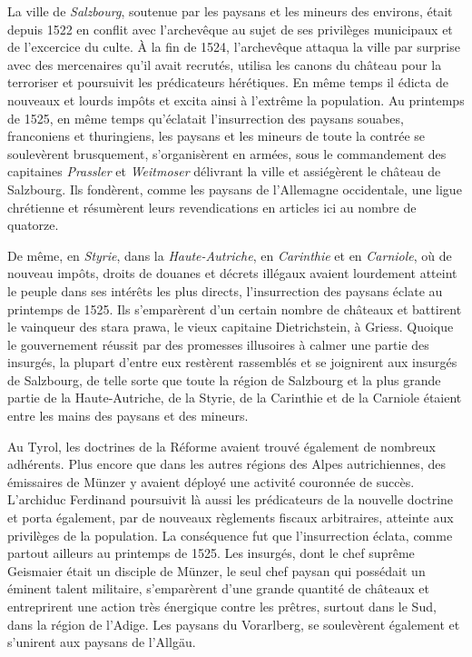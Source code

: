 \documentclass[french,twoside]{book} %
\begin{document}
La ville de \emph{Salzbourg}, soutenue par les paysans et les mineurs des environs, était depuis 1522 en conflit avec l’archevêque au sujet de ses privilèges municipaux et de l’excercice du culte. À la fin de 1524, l’archevêque attaqua la ville par surprise avec des mercenaires qu’il avait recrutés, utilisa les canons du château pour la terroriser et poursuivit les prédicateurs hérétiques. En même temps il édicta de nouveaux et lourds impôts et excita ainsi à l’extrême la population. Au printemps de 1525, en même temps qu’éclatait l’insurrection des paysans souabes, franconiens et thuringiens, les paysans et les mineurs de toute la contrée se soulevèrent brusquement, s’organisèrent en armées, sous le commandement des capitaines \emph{Prassler} et \emph{Weitmoser} délivrant la ville et assiégèrent le château de Salzbourg. Ils fondèrent, comme les paysans de l’Allemagne occidentale, une ligue chrétienne et résumèrent leurs revendications en articles ici au nombre de quatorze.\par
De même, en \emph{Styrie}, dans la \emph{Haute-Autriche}, en \emph{Carinthie} et en \emph{Carniole}, où de nouveau impôts, droits de douanes et décrets illégaux avaient lourdement atteint le peuple dans ses intérêts les plus directs, l’insurrection des paysans éclate au printemps de 1525. Ils s’emparèrent d’un certain nombre de châteaux et battirent le vainqueur des stara prawa, le vieux capitaine Dietrichstein, à Griess. Quoique le gouvernement réussit par des promesses illusoires à calmer une partie des insurgés, la plupart d’entre eux restèrent rassemblés et se joignirent aux insurgés de Salzbourg, de telle sorte que toute la région de Salzbourg et la plus grande partie de la Haute-Autriche, de la Styrie, de la Carinthie et de la Carniole étaient entre les mains des paysans et des mineurs.\par
Au Tyrol, les doctrines de la Réforme avaient trouvé également de nombreux adhérents. Plus encore que dans les autres régions des Alpes autrichiennes, des émissaires de Münzer y avaient déployé une activité couronnée de succès. L’archiduc Ferdinand poursuivit là aussi les prédicateurs de la nouvelle doctrine et porta également, par de nouveaux règlements fiscaux arbitraires, atteinte aux privilèges de la population. La conséquence fut que l’insurrection éclata, comme partout ailleurs au printemps de 1525. Les insurgés, dont le chef suprême Geismaier était un disciple de Münzer, le seul chef paysan qui possédait un éminent talent militaire, s’emparèrent d’une grande quantité de châteaux et entreprirent une action très énergique contre les prêtres, surtout dans le Sud, dans la région de l’Adige. Les paysans du Vorarlberg, se soulevèrent également et s’unirent aux paysans de l’Allgäu.\par
\end{document}
